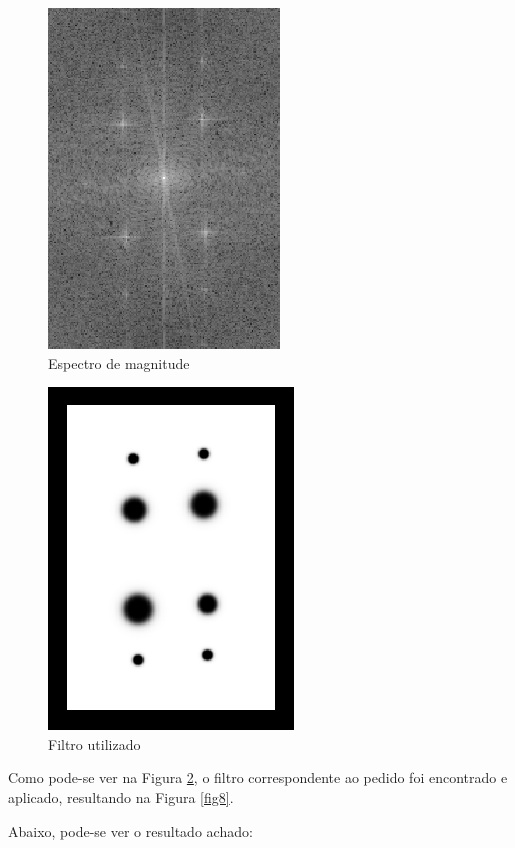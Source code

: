 \documentclass[conference]{IEEEtran}
\begin{document}
\begin{figure}[h]
    \centering
    \includegraphics[scale=0.7]{data/fourier2.png}
    \caption{Espectro de magnitude}
    \label{fig6}
\end{figure}

\begin{figure}[!ht]
    \centering
    \includegraphics[scale=0.7]{data/filter2.png}
    \caption{Filtro utilizado}
    \label{fig7}
\end{figure}

Como pode-se ver na Figura \ref{fig7}, o filtro correspondente ao pedido foi encontrado e aplicado,
resultando na Figura \ref{fig8}.

\pagebreak
Abaixo, pode-se ver o resultado achado:
\end{document}
